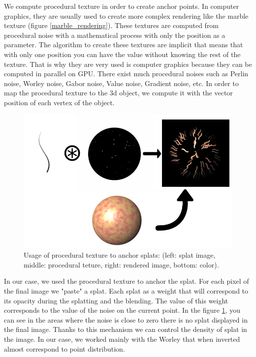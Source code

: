 
We compute procedural texture in order to create anchor points. In computer graphics, they are usually used to create more complex rendering like the marble texture (figure \ref{marble_rendering}). These textures are computed from procedural noise with a mathematical process with only the position as a parameter. The algorithm to create these textures are implicit that means that with only one position you can have the value without knowing the rest of the texture. That is why they are very used is computer graphics because they can be computed in parallel on GPU. There exist much procedural noises such as Perlin noise, Worley noise, Gabor noise, Value noise, Gradient noise, etc. In order to map the procedural texture to the 3d object, we compute it with the vector position of each vertex of the object.


\begin{figure}[H]
    \begin{center}
    \includegraphics[scale=0.6]{images/noise/addition.png}
    \end{center}
    \caption{Usage of procedural texture to anchor splats: (left: splat image, middle: procedural teture, right: rendered image, bottom: color).}
    \label{procedural_noise_anchor}
\end{figure}

In our case, we used the procedural texture to anchor the splat. For each pixel of the final image we "paste" a splat. Each splat as a weight that will correspond to its opacity during the splatting and the blending. The value of this weight corresponds to the value of the noise on the current point. In the figure \ref{procedural_noise_anchor}, you can see in the areas where the noise is close to zero there is no splat displayed in the final image. Thanks to this mechanism we can control the density of splat in the image. In our case, we worked mainly with the Worley that when inverted almost correspond to point distribution.



